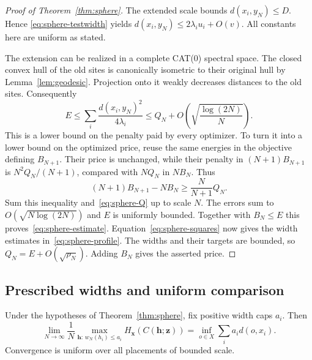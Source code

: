 \begin{proof}[Proof of Theorem~\ref{thm:sphere}]
The extended scale bounds \(d(x_i,y_N)\le D\). Hence
\eqref{eq:sphere-testwidth} yields \(d(x_i,y_N)\le2\lambda_i u_i+O(v)\).
All constants here are uniform as stated.

The extension can be realized in a complete CAT(0) spectral space.
The closed convex hull of the old sites is canonically isometric to
their original hull by Lemma~\ref{lem:geodesic}.
Projection onto it weakly decreases distances to the old sites.
Consequently
\begin{equation}\label{eq:sphere-Q}
 E\le\sum_i\frac{d(x_i,y_N)^2}{4\lambda_i}
     \le Q_N+O\!\left(\sqrt{\frac{\log(2N)}{N}}\right).
\end{equation}
This is a lower bound on the penalty paid by every optimizer. To turn
it into a lower bound on the optimized price, reuse the same energies
in the objective defining \(B_{N+1}\). Their price is unchanged, while
their penalty in \((N+1)B_{N+1}\) is \(N^2Q_N/(N+1)\), compared with
\(NQ_N\) in \(NB_N\). Thus
\[
 (N+1)B_{N+1}-NB_N\ge\frac{N}{N+1}Q_N.
\]
Sum this inequality and~\eqref{eq:sphere-Q} up to scale \(N\).
The errors sum to \(O(\sqrt{N\log(2N)})\) and \(E\) is uniformly
bounded. Together with \(B_N\le E\) this proves~\eqref{eq:sphere-estimate}.
Equation~\eqref{eq:sphere-squares} now gives the width estimates
in~\eqref{eq:sphere-profile}. The widths and their targets are bounded,
so \(Q_N=E+O(\sqrt{\rho_N})\). Adding \(B_N\) gives the asserted price.
\end{proof}

\subsection{Prescribed widths and uniform comparison}

\begin{corollary}\label{cor:sphere-caps}
Under the hypotheses of Theorem~\ref{thm:sphere}, fix positive width
caps \(a_i\). Then
\begin{equation}\label{eq:sphere-caps}
 \lim_{N\to\infty}
 \frac{1}{N}\max_{\mathbf h:\,w_N(h_i)\le a_i}
            H_{\mathbf x}(C(\mathbf h;\mathbf z))
 = \inf_{o\in X}\sum_i a_i d(o,x_i).
\end{equation}
Convergence is uniform over all placements of bounded scale.
\end{corollary}

